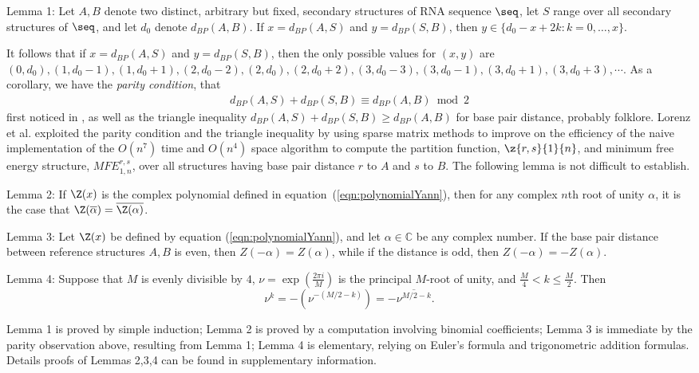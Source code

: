 \noindent
{\sc Lemma 1:} Let $A,B$ denote two distinct, arbitrary but fixed,
 secondary structures of RNA sequence $\seq$, let $S$ range over
all secondary structures of $\seq$, and let $d_0$ denote $d_{BP}(A,B)$.
If $x=d_{BP}(A,S)$ and $y=d_{BP}(S,B)$, then
$y \in \{ d_0-x+2k: k=0,\ldots,x\}$.
\medskip

\noindent
It follows that if $x=d_{BP}(A,S)$ and $y=d_{BP}(S,B)$,
then the only possible values for
$(x,y)$ are $(0,d_0), (1,d_0-1), (1,d_0+1),
(2,d_0-2), (2,d_0), (2, d_0+2),
(3,d_0-3), (3,d_0-1), (3, d_0+1), (3,d_0+3), \cdots$.
As a corollary, we have the {\em parity condition}, that
\begin{eqnarray}
\label{eqn:parity}
d_{BP}(A,S)+d_{BP}(S,B) \equiv d_{BP}(A,B) \bmod 2
\end{eqnarray}
first noticed in \cite{hofacker:RNAbor2D}, as well as
the triangle inequality
$d_{BP}(A,S)+d_{BP}(S,B) \geq d_{BP}(A,B)$
for base pair distance, probably folklore.
Lorenz et al. \cite{hofacker:RNAbor2D} exploited the parity condition
and the triangle inequality by using sparse matrix methods to improve on
the efficiency of the naive  implementation of the
$O(n^7)$ time and $O(n^4)$ space algorithm to compute
the partition function, $\z{r,s}{1}{n}$,
and minimum free energy structure, $MFE^{r,s}_{1,n}$, over all
structures having base pair distance $r$ to $A$ and $s$ to $B$.
The following lemma is not difficult to establish.
\medskip

\noindent
{\sc Lemma 2:} If $\Z(x)$ is the complex polynomial defined in
equation~(\ref{eqn:polynomialYann}), then for any complex $n$th root of
unity $\alpha$, it is the case that $\Z(\overline{\alpha}) =
\overline{\Z(\alpha)}$.
\medskip

\noindent
{\sc Lemma 3:}
Let $\Z(x)$ be defined by equation (\ref{eqn:polynomialYann}), and
let $\alpha \in \mathbb{C}$ be any complex number.
If the base pair distance between reference
structures $A,B$ is even, then $Z(-\alpha)=Z(\alpha)$, while if
the distance is odd, then $Z(-\alpha)=-Z(\alpha)$.
\medskip

\noindent
{\sc Lemma 4:} Suppose that $M$ is evenly divisible by $4$,
$\nu = \exp(\frac{2 \pi i}{M})$ is the principal $M$-root of unity, and
$\frac{M}{4} < k \leq \frac{M}{2}$. Then
\[
\nu^k = -(\nu^{-(M/2-k)}) = - \overline{\nu^{M/2-k}}.
\]
\medskip

Lemma 1 is proved by simple induction; Lemma 2
is proved by a computation involving binomial coefficients;
Lemma 3 is immediate
by the parity observation above, resulting from Lemma 1;
Lemma 4 is elementary, relying on Euler's
formula and trigonometric addition formulas. Details proofs of
Lemmas 2,3,4 can be found in supplementary information.

